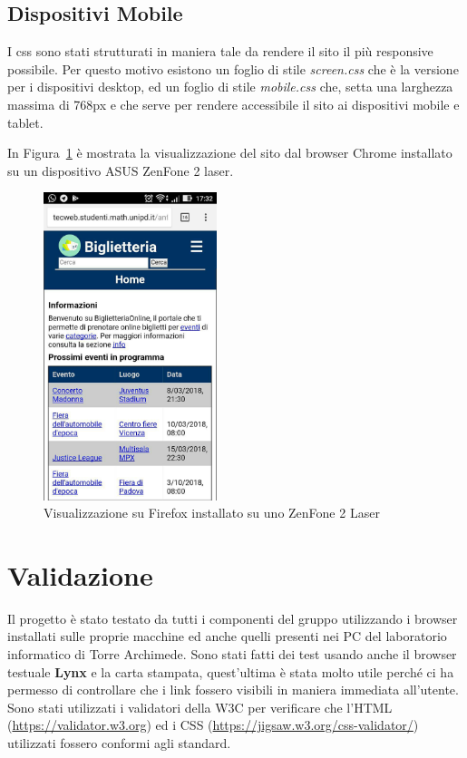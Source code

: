 \documentclass[10pt, a4paper]{article}
\begin{document}
\subsection{Dispositivi Mobile}
I css sono stati strutturati in maniera tale da rendere il sito il più responsive possibile. Per questo motivo esistono un
foglio di stile \emph{screen.css} che è la versione per i dispositivi desktop, ed un foglio 
di stile \emph{mobile.css} che, setta una larghezza massima di 768px e che serve per 
rendere accessibile il sito ai dispositivi mobile e tablet.

In Figura~\ref{fig:firefox_zen} è mostrata la visualizzazione del sito dal browser Chrome installato su un dispositivo
ASUS ZenFone 2 laser.
\begin{figure}[h!]
	\centering
	\includegraphics[width=0.45\textwidth]{Images/firefox_zen.jpg}
	\caption{Visualizzazione su Firefox installato su uno ZenFone 2 Laser}
	\label{fig:firefox_zen}
\end{figure}
\section{Validazione}
Il progetto è stato testato da tutti i componenti del gruppo utilizzando i browser installati sulle proprie macchine ed anche
quelli presenti nei PC del laboratorio informatico di Torre Archimede.
Sono stati fatti dei test usando anche il browser testuale \textbf{Lynx} e la carta stampata,
quest'ultima è stata molto utile perché ci ha permesso di controllare che i link fossero visibili
in maniera immediata all'utente.\\
Sono stati utilizzati i validatori della W3C per verificare che l'HTML
(\url{https://validator.w3.org}) ed i CSS (\url{https://jigsaw.w3.org/css-validator/})
utilizzati fossero conformi agli standard.
\end{document}
